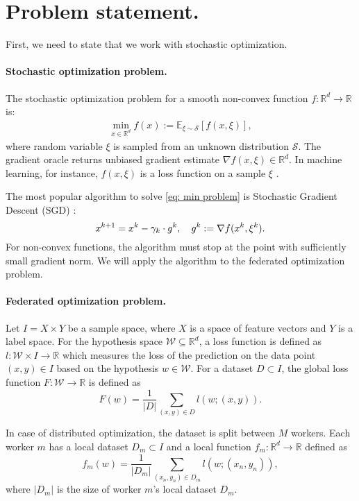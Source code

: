 \documentclass{article}
\newcommand{\EE}{\mathbb{E}}
\newcommand{\R}{\mathbb{R}}
\newcommand{\algname}[1]{{\sf  #1}\xspace}
\begin{document}
\section{Problem statement.}
First, we need to state that we work with stochastic optimization.
\paragraph{Stochastic optimization problem.} The stochastic optimization problem for a smooth non-convex function $f:\R^d \to \R$ is:
\begin{eqnarray}
    \min\limits_{x \in \R^d} f(x) := \EE_{\xi \sim \mathcal{S}} [f(x, \xi)],\label{eq: min problem}
\end{eqnarray}
where random variable $\xi$ is sampled from an unknown distribution $\mathcal{S}.$ The gradient oracle returns unbiased gradient estimate $\nabla f (x, \xi) \in \R^d$. In machine learning, for instance, $f(x, \xi)$ is a loss function on a sample $\xi$ \parencite{ShalevShwartz2014}.

The most popular algorithm to solve \eqref{eq: min problem} is Stochastic Gradient Descent (\algname{SGD}) 
 \parencite{Robbins1951}:
\begin{equation}
    x^{k+1} = x^k - \gamma_k \cdot  g^k, \quad g^k := \nabla f (x^k, \xi^k). \notag \label{eq: sgd intro}
\end{equation}
For non-convex functions, the algorithm must stop at the point with sufficiently small gradient norm.
We will apply the algorithm to the federated optimization problem.

\paragraph{Federated optimization problem.}
Let $I = X \times Y$ be a sample space, where $X$ is a space of feature vectors and $Y$ is a label space. For the hypothesis space $\mathcal{W} \subseteq \R^d$, a loss function is defined as $l: \mathcal{W}\times I \rightarrow \R$ which measures the loss of the prediction on the data point $(x,y) \in I$ based on the hypothesis $w \in \mathcal{W}$. For a dataset $D \subset I$, the global loss function $F:\mathcal{W}\to \R$ is defined as
\begin{equation}
F(w) = \frac{1}{|D|}\sum_{(x,y)\in D}l(w;(x,y)).
\end{equation}

In case of distributed optimization, the dataset is split between $M$ workers. Each worker $m$ has a local dataset $D_m \subset I$ and a local function $f_m:\R^d \to \R$ defined as
\begin{equation}
f_m(w)=\frac{1}{|D_m|}\sum_{(x_n,y_n)\in D_m}l(w;(x_n,y_n)),
\end{equation}
where $|D_m|$ is the size of worker $m$'s local dataset $D_m$.
\end{document}
